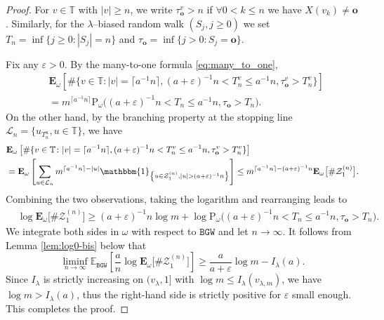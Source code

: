 \documentclass[10pt,a4paper]{amsart}
\newcommand{\EE}{\mathbb{E}} %
\newcommand{\Ew}{\mathbf{E}_{\omega}} %
\newcommand{\Pws}{\mathrm{P}_{\omega}} %
\newcommand{\TT}{\mathbb{T}} %
\newcommand{\ind}[1]{\mathbbm{1}_{\left\{ #1 \right\} } } %
\newcommand{\rt}{\mathbf{o}} %
\begin{document}
\begin{proof}
	For $v\in \TT$ with $\vert v\vert\ge n$, we write $\tau_\rt^v > n$ if $\forall 0< k\leq n$  
	we have $X(v_k)\neq \rt$. Similarly, for the $\lambda$--biased random walk $(S_j, j\geq 0)$ we set $T_n = \inf\{j\ge 0\colon |S_j|=n  \}$ and $\tau_{\rt} = \inf\{j > 0\colon S_j = \rt  \}$.  
	
	Fix any $\varepsilon>0$. By the many-to-one formula \eqref{eq:many_to_one},
	\begin{align*}
		  & \Ew\left[	\# \{v\in \TT\colon |v|= \lceil a^{-1} n\rceil , (a+\varepsilon)^{-1}n<T^v_{n } \le a^{-1} n  , \tau^v_\rt >T^v_{n}  \} \right] \\
		& = m^{ \lceil a^{-1}  n\rceil } \Pws\big( (a+\varepsilon)^{-1}n< T_{n } \le a^{-1} n, \tau_\rt >T_{n}  \big). 
	\end{align*} 
On the other hand, by the branching property at the stopping line 
$\mathcal{L}_{n}=\{u_{T^u_{n }}, u\in \TT \}$, we have 
\begin{align*}
	&\Ew\left[\# \{v\in \TT\colon  |v|= \lceil a^{-1} n\rceil ,(a+\varepsilon)^{-1}n<T^v_{n } \le a^{-1} n , \tau^v_\rt >T^v_{n}  \} \right] \\
	&= \Ew\left[	\sum_{u\in \mathcal{L}_n } m^{\lceil a^{-1} n \rceil - |u|} \ind{u\in\mathcal{Z}^{(n)}_1 , |u|>  (a+\varepsilon)^{-1}n} \right] 
		\leq m^{\lceil a^{-1}n \rceil- (a+\varepsilon)^{-1}n}\Ew\big[	\# \mathcal{Z}^{(n)}_1 \big].
\end{align*}
Combining the two observations, taking the logarithm and rearranging leads to
	\begin{align}\label{eq:lem-log-Z1}
	&	\log\Ew\big[	\# \mathcal{Z}^{(n)}_1\big]
		\ge (a+\varepsilon)^{-1} n \log m + \log  \Pws\big( (a+\varepsilon)^{-1}n< T_{n } \le a^{-1} n, \tau_\rt >T_{n}  \big) . 
	\end{align}
 We integrate both sides in $\omega$ with respect to $\mathtt{BGW}$ and let $n\to \infty$.  
It follows from Lemma \ref{lem:log0-bis} below  that
\begin{equation}
	\liminf_{n \to \infty}\EE_{\mathtt{BGW}} \left[ \frac{a}{n} \log \Ew\big[\# \mathcal{Z}^{(n)}_1\big]\right] \ge \frac{a}{a+\varepsilon} \log m -I_{\lambda} (a).\label{eq:rw-ldp}
\end{equation}
Since $I_{\lambda}$ is strictly increasing on $(v_{\lambda},1]$ with $\log m \leq I_{\lambda}(v_{\lambda, m})$, we have  $\log m> I_{\lambda}(a)$, thus the right-hand side is strictly positive for $\varepsilon$ small enough. 
This completes the proof.
\end{proof}
\end{document}

